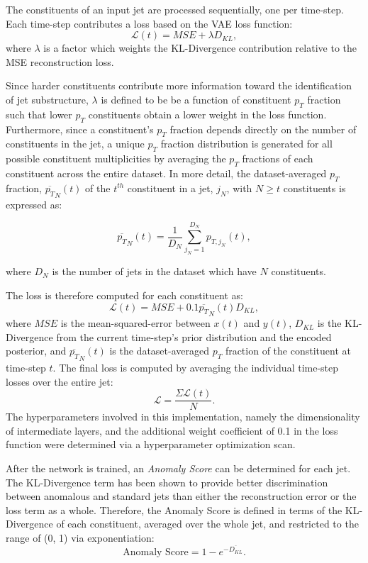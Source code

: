 \documentclass[11pt, a4paper]{article}
\begin{document}
The constituents of an input jet are processed sequentially, one per time-step. 
Each time-step contributes a loss based on the VAE loss function: 
\begin{equation}
\mathcal{L}(t) = MSE + \lambda D_{KL},
\end{equation}
where $\lambda$ is a factor which weights the KL-Divergence contribution relative to the MSE reconstruction loss.

Since harder constituents contribute more information toward the identification of jet substructure, $\lambda$ is defined to be be a function of constituent $p_{T}$ fraction such that lower $p_{T}$ constituents obtain a lower weight in the loss function. 
Furthermore, since a constituent's $p_{T}$ fraction depends directly on the number of constituents in the jet, a unique $p_{T}$ fraction distribution is generated for all possible constituent multiplicities by averaging the $p_{T}$ fractions of each constituent across the entire dataset. In more detail, the dataset-averaged $p_{T}$ fraction, $\overline{p_{T}}_{N}(t)$ of the $t^{th}$ constituent in a jet, $j_{N}$, with $N \geq t$ constituents is expressed as:


\begin{equation}
\overline{p_{T}}_{N}(t)=\frac{1}{D_{N}}\displaystyle\sum_{j_{N} = 1}^{D_{N}} p_{T,j_{N}}(t),
\end{equation}

where $D_{N}$ is the number of jets in the dataset which have $N$ constituents.

The loss is therefore computed for each constituent as:
\begin{equation}
\mathcal{L}(t)=MSE+0.1\overline{p_{T}}_{N}(t)D_{KL},
\end{equation}
where $MSE$ is the mean-squared-error between $x(t)$ and $y(t)$, $D_{KL}$ is the KL-Divergence from the current time-step's prior distribution and the encoded posterior, and $\overline{p_T}_{N}(t)$ is the dataset-averaged $p_T$ fraction of the constituent at time-step $t$. The final loss is computed by averaging the individual time-step losses over the entire jet: 
\begin{equation}
\mathcal{L} = \frac{\Sigma \mathcal{L}(t)}{N}.
\end{equation} 
The hyperparameters involved in this implementation, namely the dimensionality of intermediate layers, and the additional weight coefficient of 0.1 in the loss function were determined via a hyperparameter optimization scan. 

After the network is trained, an \textit{Anomaly Score} can be determined for each jet. The KL-Divergence term has been shown to provide better discrimination between anomalous and standard jets than either the reconstruction error or the loss term as a whole. Therefore, the Anomaly Score is defined in terms of the KL-Divergence of each constituent, averaged over the whole jet, and restricted to the range of (0, 1) via exponentiation:
\begin{equation}
	\text{Anomaly Score} = 1 - e^{-\overline{D_{KL}}}.
\end{equation}
\end{document}
